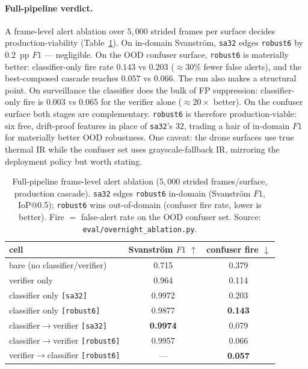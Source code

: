 \paragraph{Full-pipeline verdict.}
A frame-level alert ablation over $5{,}000$ strided frames per surface decides production-viability (Table~\ref{tab:robust6_pipeline}). On in-domain Svanstr\"om, \texttt{sa32} edges \texttt{robust6} by $0.2$~pp $F1$ --- negligible. On the OOD confuser surface, \texttt{robust6} is materially better: classifier-only fire rate $0.143$ vs $0.203$ (${\approx}30\%$ fewer false alerts), and the best-composed cascade reaches $0.057$ vs $0.066$. The run also makes a structural point. On surveillance the classifier does the bulk of FP suppression: classifier-only fire is $0.003$ vs $0.065$ for the verifier alone (${\approx}20\times$ better). On the confuser surface both stages are complementary. \texttt{robust6} is therefore production-viable: six free, drift-proof features in place of \texttt{sa32}'s $32$, trading a hair of in-domain $F1$ for materially better OOD robustness. One caveat: the drone surfaces use true thermal IR while the confuser set uses grayscale-fallback IR, mirroring the deployment policy but worth stating.

\begin{table}[htbp]
    \centering
    \caption{Full-pipeline frame-level alert ablation ($5{,}000$ strided frames/surface, production cascade). \texttt{sa32} edges \texttt{robust6} in-domain (Svanstr\"om $F1$, IoP@0.5); \texttt{robust6} wins out-of-domain (confuser fire rate, lower is better). Fire $=$ false-alert rate on the OOD confuser set. Source: \texttt{eval/overnight\_ablation.py}.}
    \label{tab:robust6_pipeline}
    \begin{tabular}{lcc}
        \toprule
        cell & Svanstr\"om $F1$ $\uparrow$ & confuser fire $\downarrow$ \\
        \midrule
        bare (no classifier/verifier)        & 0.715 & 0.379 \\
        verifier only                        & 0.964 & 0.114 \\
        classifier only \texttt{[sa32]}      & 0.9972 & 0.203 \\
        classifier only \texttt{[robust6]}   & 0.9877 & \textbf{0.143} \\
        classifier$\to$verifier \texttt{[sa32]}    & \textbf{0.9974} & 0.079 \\
        classifier$\to$verifier \texttt{[robust6]} & 0.9957 & 0.066 \\
        verifier$\to$classifier \texttt{[robust6]} & --- & \textbf{0.057} \\
        \bottomrule
    \end{tabular}
\end{table}

